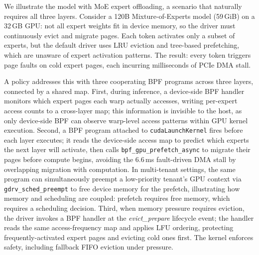 

We illustrate the model with MoE expert offloading, a scenario that naturally requires all three layers. Consider a 120B Mixture-of-Experts model (59\,GiB) on a 32\,GB GPU: not all expert weights fit in device memory, so the driver must continuously evict and migrate pages. Each token activates only a subset of experts, but the default driver uses LRU eviction and tree-based prefetching, which are unaware of expert activation patterns. The result: every token triggers page faults on cold expert pages, each incurring milliseconds of PCIe DMA stall.

A \sys policy addresses this with three cooperating BPF programs across three layers, connected by a shared map. First, during inference, a device-side BPF handler monitors which expert pages each warp actually accesses, writing per-expert access counts to a cross-layer map; this information is invisible to the host, as only device-side BPF can observe warp-level access patterns within GPU kernel execution. Second, a BPF program attached to \texttt{cudaLaunchKernel} fires before each layer executes; it reads the device-side access map to predict which experts the next layer will activate, then calls \texttt{bpf\_gpu\_prefetch\_async} to migrate their pages before compute begins, avoiding the 6.6\,ms fault-driven DMA stall by overlapping migration with computation. In multi-tenant settings, the same program can simultaneously preempt a low-priority tenant's GPU context via \texttt{gdrv\_sched\_preempt} to free device memory for the prefetch, illustrating how memory and scheduling are coupled: prefetch requires free memory, which requires a scheduling decision. Third, when memory pressure requires eviction, the driver invokes a BPF handler at the \emph{evict\_prepare} lifecycle event; the handler reads the same access-frequency map and applies LFU ordering, protecting frequently-activated expert pages and evicting cold ones first. The kernel enforces safety, including fallback FIFO eviction under pressure.

